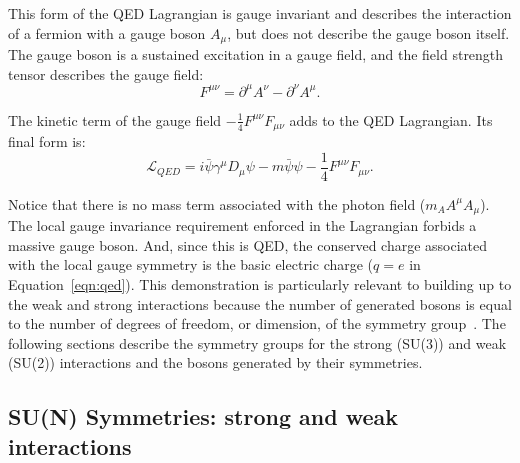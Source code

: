 This form of the QED Lagrangian is gauge invariant and describes the interaction of a fermion with a gauge boson $A_{\mu}$, but does not describe the gauge boson itself. The gauge boson is a sustained excitation in a gauge field, and the field strength tensor describes the gauge field:
\begin{equation}
    F^{\mu\nu} = \partial^{\mu} A^{\nu} - \partial^{\nu}A^{\mu}.
\end{equation}

The kinetic term of the gauge field $-\frac{1}{4}F^{\mu\nu}F_{\mu\nu}$ adds to the QED Lagrangian. Its final form is:
\begin{equation}
    \mathcal{L}_{QED} = i\bar{\psi}\gamma^{\mu}D_{\mu}\psi - m \bar{\psi}\psi - \frac{1}{4}F^{\mu\nu}F_{\mu\nu}.
    \label{eqn:qed}
\end{equation}

Notice that there is no mass term associated with the photon field ($m_A A^{\mu}A_{\mu}$). The local gauge invariance requirement enforced in the Lagrangian forbids a massive gauge boson. And, since this is QED, the conserved charge associated with the local gauge symmetry is the basic electric charge ($q = e$ in Equation~\ref{eqn:qed}). This demonstration is particularly relevant to building up to the weak and strong interactions because the number of generated bosons is equal to the number of degrees of freedom, or dimension, of the symmetry group~\cite{mandl_shaw_2011}. The following sections describe the symmetry groups for the strong (SU(3)) and weak (SU(2)) interactions and the bosons generated by their symmetries.

\subsection{SU(N) Symmetries: strong and weak interactions}

